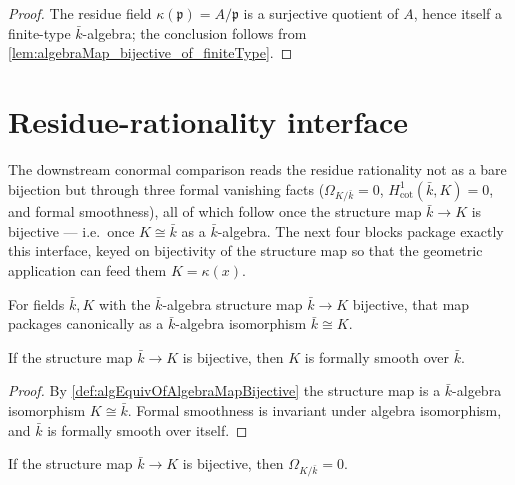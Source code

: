 \begin{proof}\leanok
  The residue field $\kappa(\mathfrak{p}) = A/\mathfrak{p}$ is a surjective
  quotient of $A$, hence itself a finite-type $\bar k$-algebra; the conclusion
  follows from \cref{lem:algebraMap_bijective_of_finiteType}.
\end{proof}

\section{Residue-rationality interface}

The downstream conormal comparison reads the residue rationality not as a bare
bijection but through three formal vanishing facts ($\Omega_{K/\bar k} = 0$,
$H^1_{\mathrm{cot}}(\bar k, K) = 0$, and formal smoothness), all of which follow
once the structure map $\bar k \to K$ is bijective --- i.e.\ once $K \cong \bar k$
as a $\bar k$-algebra.  The next four blocks package exactly this interface,
keyed on bijectivity of the structure map so that the geometric application can
feed them $K = \kappa(x)$.

\begin{definition}
  \label{def:algEquivOfAlgebraMapBijective}
  For fields $\bar k, K$ with the $\bar k$-algebra structure map $\bar k \to K$
  bijective, that map packages canonically as a $\bar k$-algebra isomorphism
  $\bar k \cong K$.
\end{definition}

\begin{lemma}
  \label{lem:formallySmooth_of_algebraMap_bijective}
  If the structure map $\bar k \to K$ is bijective, then $K$ is formally smooth
  over $\bar k$.
\end{lemma}

\begin{proof}
  \leanok
  By \cref{def:algEquivOfAlgebraMapBijective} the structure map is a
  $\bar k$-algebra isomorphism $K \cong \bar k$.  Formal smoothness is invariant
  under algebra isomorphism, and $\bar k$ is formally smooth over itself.
\end{proof}

\begin{lemma}
  \label{lem:subsingleton_kaehlerDifferential_of_algebraMap_bijective}
  If the structure map $\bar k \to K$ is bijective, then $\Omega_{K/\bar k} = 0$.
\end{lemma}

